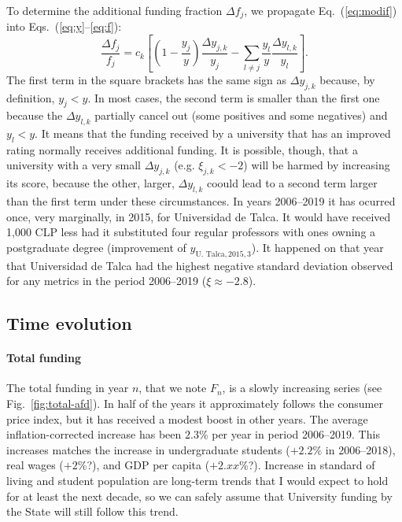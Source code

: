 \documentclass[twocolumn]{article}
\def\eqref#1{Eq.~(\ref{eq:#1})}
\def\eqsref#1#2{Eqs.~(\ref{eq:#1}--\ref{eq:#2})}
\begin{document}
To determine the additional funding fraction $\Delta f_j$, we propagate 
\eqref{modif} into \eqsref{y}{f}:
\begin{equation}
    \frac{\Delta f_j}{f_j} = c_k \left[
                     \left(1 - \frac{y_{j}}y\right)\frac{\Delta y_{j,k}}{y_{j}}
                    - \sum_{l \ne j} \frac{y_l}y \frac{\Delta y_{l,k}}{y_l}
                 \right].
\end{equation}
The first term in the square brackets has the same sign as $\Delta y_{j,k}$ because, by definition, $y_j < y$.  In most cases, the second term is smaller than the first one because the $\Delta y_{l,k}$ partially cancel out (some positives and some negatives) and $y_l < y$. It means that the funding received by a university that has an improved rating normally receives additional funding.  It is possible, though, that a university with a very small $\Delta y_{j,k}$ (e.g. $\xi_{j,k} < -2$) will be harmed by increasing its score, because the other, larger, $\Delta y_{l,k}$ coould lead to a second term larger than the first term under these circumstances.  In years 2006--2019 it has ocurred once, very marginally, in 2015, for Universidad de Talca.  It would have received 1,000 CLP less had it substituted four regular professors with ones owning a postgraduate degree (improvement of $y_{\text{U. Talca}, 2015, 3}$).  It happened on that year that Universidad de Talca had the highest negative standard deviation observed for any metrics in the period 2006--2019 ($\xi \approx -2.8$). 

\subsection{Time evolution}
\paragraph{Total funding}
The total funding in year $n$, that we note $F_{n}$, is a slowly increasing series (see Fig.~\ref{fig:total-afd}). In half of the years it approximately follows the consumer price index, but it has received a modest boost in other years.  The average inflation-corrected increase has been $2.3$\% per year in period 2006--2019. This increases matches the increase in undergraduate students ($+2.2\%$ in 2006--2018), real wages ($+2\%$?), and GDP per capita ($+2.xx$\%?). Increase in standard of living and student population are long-term trends that I would expect to hold for at least the next decade, so we can safely assume that University funding by the State will still follow this trend.
\end{document}

